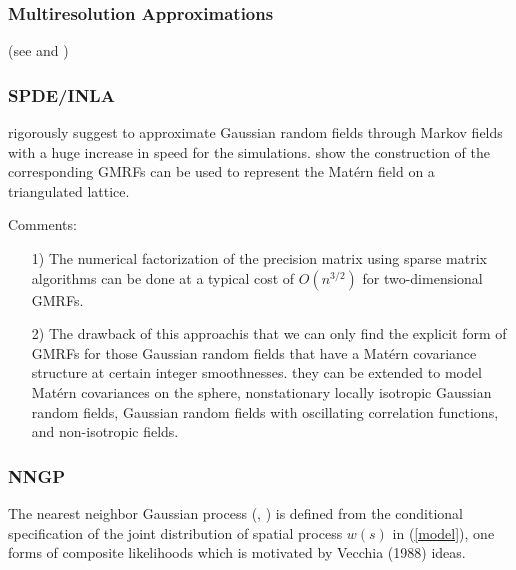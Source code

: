 \documentclass[
12pt, %
a4paper, %
oneside, %
headinclude,footinclude, %
BCOR5mm, %
]{scrartcl}
\begin{document}
\subsubsection{Multiresolution Approximations}
 (see  \href{https://chenyw68.github.io/Literature/[2017-formal]Parallel inference for massive distributed spatial data using low-rank models.pdf
}{\citep{katzfuss2017parallel}} and  \href{https://chenyw68.github.io/Literature/[2017]A Multi-Resolution Approximation for Massive Spatial Datasets.pdf}{\citep{katzfuss2017multi}})
\subsubsection{SPDE/INLA}
\href{https://chenyw68.github.io/Literature/[2005]Gaussian markov random fields theory and applications.pdf}{\citet{rue2005gaussian}} rigorously suggest to approximate Gaussian random fields through Markov fields with a huge increase in speed for the simulations. \href{https://chenyw68.github.io/Literature/[2011]An explicit link between GF and GMRFs the SPDE approach.pdf}{\citep{lindgren2011explicit}} show the construction of the corresponding GMRFs can be used to represent the Matérn field on a triangulated lattice.

\textcolor[rgb]{1.00,0.00,1.00}{Comments:}
\begin{itemize}
 \item [1)]The numerical factorization of the precision matrix using sparse matrix algorithms can be done at a typical cost of $O(n^{3/2})$ for two-dimensional GMRFs.
 \item [2)]The drawback of this approachis that we can only find the explicit form of GMRFs for those Gaussian random fields that have a Matérn covariance structure at certain integer smoothnesses.  they can be extended to model Matérn covariances on the sphere, nonstationary locally isotropic Gaussian random fields, Gaussian random fields with oscillating correlation functions, and non-isotropic fields.
\end{itemize}

\subsubsection{NNGP}
The nearest neighbor Gaussian process (\href{https://chenyw68.github.io/Literature/[2016]Hierarchical nearest-neighbor Gaussian process models for large geostatistical datasets.pdf}{\cite{datta2016hierarchical}},
\href{https://chenyw68.github.io/Literature/[2019]Efficient algorithms for bayesian nearest neighbor gaussian processes.pdf}{\cite{finley2019efficient}}
) is defined from the conditional specification of the joint distribution of spatial process $w(s)$ in (\ref{model}), one forms of composite likelihoods which is motivated by Vecchia (1988) ideas.
\end{document}
